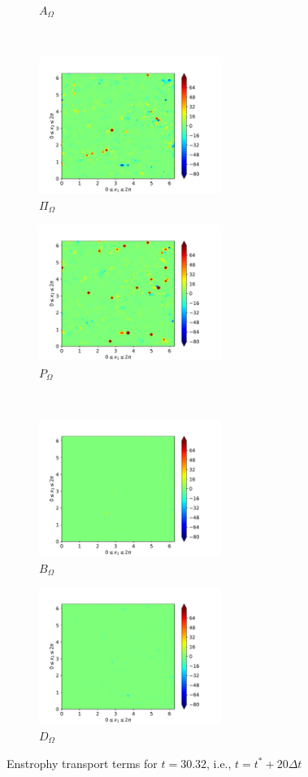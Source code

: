 \begin{figure}[H]
\begin{subfigure}{0.45\textwidth}
        \caption{$A_{\Omega}$}
    \end{subfigure}
    ~
    \begin{subfigure}{0.45\textwidth}
        \includegraphics[height=1.75in]{media/run-cds-65/Pi-enst-1360}
        \caption{$\Pi_{\Omega}$}
    \end{subfigure}
    \newline
    \begin{subfigure}{0.45\textwidth}
        \includegraphics[height=1.75in]{media/run-cds-65/P-enst-1360}
        \caption{$P_{\Omega}$}
    \end{subfigure}
    ~
    \begin{subfigure}{0.45\textwidth}
        \includegraphics[height=1.75in]{media/run-cds-65/B-enst-1360}
        \caption{$B_{\Omega}$}
    \end{subfigure}
    \newline
    \begin{subfigure}{0.45\textwidth}
        \includegraphics[height=1.75in]{media/run-cds-65/D-enst-1360}
        \caption{$D_{\Omega}$}
    \end{subfigure}
    \caption{Enstrophy transport terms for $t=30.32$, i.e., $t=t^{\ast} + 20 \Delta t$}
\end{figure}

